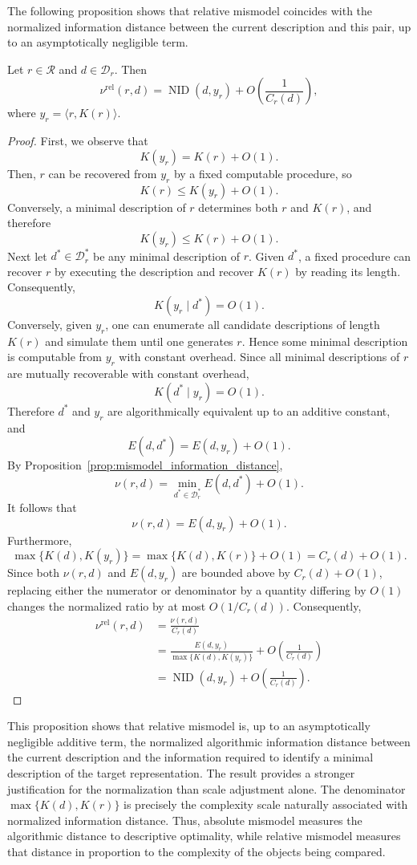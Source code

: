 The following proposition shows that relative mismodel coincides with the normalized information distance between the current description and this pair, up to an asymptotically negligible term.

\begin{proposition}
\label{prop:relative_mismodel_normalized_distance}
Let $r\in\mathcal R$ and $d\in\mathcal D_r$.
Then
\[
\nu^{\mathrm{rel}}(r,d) = \operatorname{NID}(d,y_r) + O\left(\frac{1}{C_r(d)}\right),
\]
where $y_r=\langle r,K(r)\rangle$.
\end{proposition}
\begin{proof}
First, we observe that
\[
K(y_r)=K(r)+O(1).
\]
Then, $r$ can be recovered from $y_r$ by a fixed computable procedure, so
\[
K(r)\le K(y_r)+O(1).
\]
Conversely, a minimal description of $r$ determines both $r$ and $K(r)$, and therefore
\[
K(y_r)\le K(r)+O(1).
\]
Next let $d^\ast\in\mathcal D_r^\ast$ be any minimal description of $r$. Given $d^\ast$, a fixed procedure can recover $r$ by executing the description and recover $K(r)$ by reading its length. Consequently,
\[
K(y_r\mid d^\ast)=O(1).
\]
Conversely, given $y_r$, one can enumerate all candidate descriptions of length $K(r)$ and simulate them until one generates $r$. Hence some minimal description is computable from $y_r$ with constant overhead. Since all minimal descriptions of $r$ are mutually recoverable with constant overhead,
\[
K(d^\ast\mid y_r)=O(1).
\]
Therefore $d^\ast$ and $y_r$ are algorithmically equivalent up to an additive constant, and
\[
E(d,d^\ast)=E(d,y_r)+O(1).
\]
By Proposition~\ref{prop:mismodel_information_distance},
\[
\nu(r,d) = \min_{d^\ast\in\mathcal D_r^\ast}E(d,d^\ast)+O(1).
\]
It follows that
\[
\nu(r,d) = E(d,y_r) + O(1).
\]
Furthermore,
\[
\max\{K(d),K(y_r)\} = \max\{K(d),K(r)\}+O(1) = C_r(d)+O(1).
\]
Since both $\nu(r,d)$ and $E(d,y_r)$ are bounded above by $C_r(d)+O(1)$, replacing either the numerator or denominator by a quantity differing by $O(1)$ changes the normalized ratio by at most $O(1/C_r(d))$. Consequently,
\[
\begin{aligned}
\nu^{\mathrm{rel}}(r,d)
& = \frac{\nu(r,d)}{C_r(d)}\\
& = \frac{E(d,y_r)}{\max\{K(d),K(y_r)\}} + O\left(\frac{1}{C_r(d)}\right)\\
& = \operatorname{NID}(d,y_r) + O\left(\frac{1}{C_r(d)}\right).
\end{aligned}
\]
\end{proof}

This proposition shows that relative mismodel is, up to an asymptotically negligible additive term, the normalized algorithmic information distance between the current description and the information required to identify a minimal description of the target representation. The result provides a stronger justification for the normalization than scale adjustment alone. The denominator $\max\{K(d),K(r)\}$ is precisely the complexity scale naturally associated with normalized information distance. Thus, absolute mismodel measures the algorithmic distance to descriptive optimality, while relative mismodel measures that distance in proportion to the complexity of the objects being compared.


